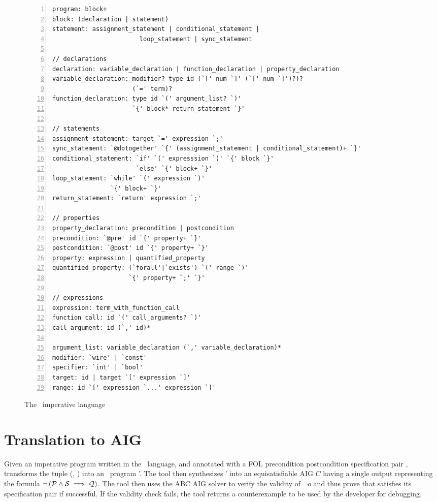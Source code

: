 \begin{figure}[h!]
\centering
\begin{Verbatim}[fontsize=\relsize{-1.0}, numbersep=4pt,numbers=left]
program: block+
block: (declaration | statement)
statement: assignment_statement | conditional_statement | 
                        loop_statement | sync_statement		

// declarations
declaration: variable_declaration | function_declaration | property_declaration
variable_declaration: modifier? type id (`[' num `]' (`[' num `]')?)?
                      (`=' term)?
function_declaration: type id `(' argument_list? `)'
                      `{' block* return_statement `}'

// statements
assignment_statement: target `=' expression `;'
sync_statement: `@dotogether' `{' (assignment_statement | conditional_statement)+ `}'
conditional_statement: `if' `(' expresssion `)' `{' block `}'
                       `else' `{' block+ `}'
loop_statement: `while' `(' expression `)' 
                `{' block+ `}'
return_statement: `return' expression `;'

// properties
property_declaration: precondition | postcondition
precondition: `@pre' id `{' property+ `}'
postcondition: `@post' id `{' property+ `}'
property: expression | quantified_property
quantified_property: (`forall'|`exists') `(' range `)'
                     `{' property+ `;' `}'   

// expressions
expression: term_with_function_call
function call: id `(' call_arguments? `)'
call_argument: id (`,' id)*

argument_list: variable_declaration (`,' variable_declaration)*
modifier: `wire' | `const'
specifier: `int' | `bool'            
target: id | target `[' expression `]'
range: id `[' expression `...' expression `]' 
\end{Verbatim}
\caption{The \psqlanguage~imperative language}
\label{fig:grammar}
\end{figure}

\section{Translation to AIG}
\label{chap:c2aig:sec:translation}
Given an imperative program \Pm written in the \psqlanguage~language, 
and annotated with a FOL precondition postcondition 
specification pair \pair{\Pre}{\Post}, 
\mytool{} transforms the tuple (\Pm, \pair{\Pre}{\Post}) into an 
\thislanguage~program \Pm'. The tool then synthesizes \Pm'
into an equisatisfiable AIG $C$ having a single output
representing the formula $\lnot \left( \mathcal{P} \land \mathcal{S} \implies \mathcal{Q} \right)$. 
The tool then uses the ABC AIG solver to verify the validity 
of $\lnot o$ and thus prove that \Pm satisfies its
specification pair \pair{\Pre}{\Post} if successful. If the validity check fails, 
the tool returns a counterexample to be used by the developer for debugging.

